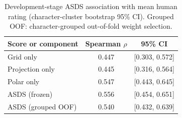 \begin{table}[t]
\caption{Development-stage ASDS association with mean human rating
(character-cluster bootstrap 95\% CI). Grouped OOF: character-grouped
out-of-fold weight selection.}
\label{tab:spatial-score-development}
\centering
\scriptsize
\setlength{\tabcolsep}{3pt}
\begin{tabular}{@{}lcc@{}}
\toprule
Score or component & Spearman \(\rho\) & 95\% CI \\
\midrule
Grid only & 0.447 & [0.303, 0.572] \\
Projection only & 0.445 & [0.316, 0.564] \\
Polar only & 0.547 & [0.443, 0.645] \\
ASDS (frozen) & 0.556 & [0.454, 0.651] \\
ASDS (grouped OOF) & 0.540 & [0.432, 0.639] \\
\bottomrule
\end{tabular}
\end{table}
